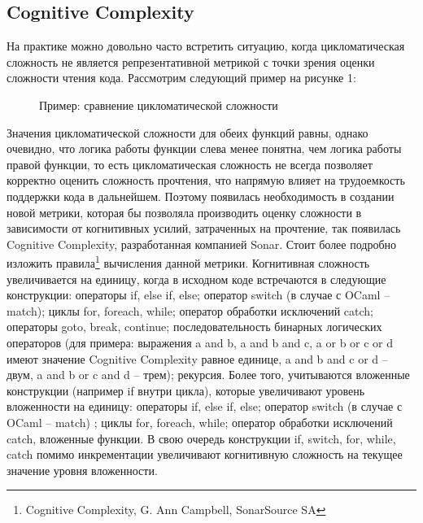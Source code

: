 \subsection{Cognitive Complexity}
На практике можно довольно часто встретить ситуацию, когда цикломатическая сложность
не является репрезентативной метрикой с точки зрения оценки сложности чтения кода. Рассмотрим следующий пример на рисунке 1:
\begin{figure}[h]
    \caption{Пример: сравнение цикломатической сложности}
\end{figure}

Значения цикломатической сложности для обеих функций равны, однако очевидно, что логика 
работы функции слева менее понятна, чем логика работы правой функции, то есть цикломатическая сложность не всегда позволяет корректно оценить сложность прочтения, что напрямую влияет на трудоемкость поддержки кода в дальнейшем. Поэтому появилась 
необходимость в создании новой метрики, которая бы позволяла производить оценку сложности 
в зависимости от когнитивных усилий, затраченных на прочтение, так появилась Cognitive 
Complexity, разработанная компанией Sonar.
Стоит более подробно изложить правила\footnote{Cognitive Complexity, G. Ann Campbell, 
SonarSource SA} вычисления данной метрики. Когнитивная сложность увеличивается на единицу, 
когда в исходном коде встречаются в следующие конструкции: операторы if, else if, else; 
оператор switch (в случае с OCaml -- match); циклы for, foreach, while; оператор обработки 
исключений catch; операторы goto, break, continue; последовательность бинарных логических 
операторов (для примера: выражения a and b, a and b and c, a or b or c or d имеют значение 
Cognitive Complexity равное единице, a and b and c or d -- двум, a and b or c and d -- трем); рекурсия.
Более того, учитываются вложенные конструкции (например if внутри цикла), которые
увеличивают уровень вложенности на единицу: операторы if, else if, else; оператор switch 
(в случае с OCaml -- match)
; циклы for, foreach, while; оператор обработки исключений catch, вложенные функции. В 
свою очередь конструкции if, switch, for, while, catch помимо инкрементации увеличивают когнитивную сложность на текущее значение уровня вложенности.

